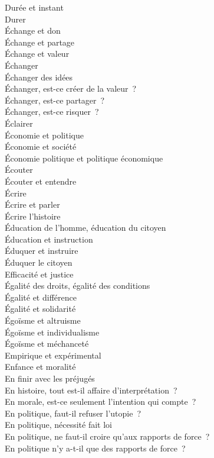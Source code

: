\documentclass[a4paper,12pt]{article}
\begin{document}
Durée et instant \\
Durer \\
Échange et don \\
Échange et partage \\
Échange et valeur \\
Échanger \\
Échanger des idées \\
Échanger, est-ce créer de la valeur ? \\
Échanger, est-ce partager ? \\
Échanger, est-ce risquer ? \\
Éclairer \\
Économie et politique \\
Économie et société \\
Économie politique et politique économique \\
Écouter \\
Écouter et entendre \\
Écrire \\
Écrire et parler \\
Écrire l'histoire \\
Éducation de l'homme, éducation du citoyen \\
Éducation et instruction \\
Éduquer et instruire \\
Éduquer le citoyen \\
Efficacité et justice \\
Égalité des droits, égalité des conditions \\
Égalité et différence \\
Égalité et solidarité \\
Égoïsme et altruisme \\
Égoïsme et individualisme \\
Égoïsme et méchanceté \\
Empirique et expérimental \\
Enfance et moralité \\
En finir avec les préjugés \\
En histoire, tout est-il affaire d'interprétation ? \\
En morale, est-ce seulement l'intention qui compte ? \\
En politique, faut-il refuser l'utopie ? \\
En politique, nécessité fait loi \\
En politique, ne faut-il croire qu'aux rapports de force ? \\
En politique n'y a-t-il que des rapports de force ? \\
\end{document}
